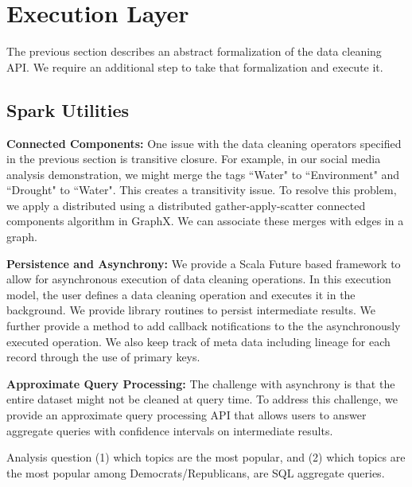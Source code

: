 \section{Execution Layer}
The previous section describes an abstract formalization of the data cleaning API.
We require an additional step to take that formalization and execute it.

\subsection{Spark Utilities}

\vspace{0.5em}

\noindent\textbf{Connected Components: } One issue with the data cleaning operators specified in the previous section is transitive closure. For example, in our social media analysis demonstration, we might merge the tags ``Water" to ``Environment" and ``Drought" to ``Water". This creates a transitivity issue. To resolve this problem, we apply a distributed using a distributed gather-apply-scatter connected components algorithm in GraphX. We can associate these merges with edges in a graph.

\noindent\textbf{Persistence and Asynchrony: } We provide a Scala \textsf{Future} based framework to allow for asynchronous execution of data cleaning operations.
In this execution model, the user defines a data cleaning operation and executes it in the background.
We provide library routines to persist intermediate results.
We further provide a method to add callback notifications to the the asynchronously executed operation.
We also keep track of meta data including lineage for each record through the use of primary keys.

\noindent\textbf{Approximate Query Processing: }
The challenge with asynchrony is that the entire dataset might not be cleaned at query time. To address this challenge, 
we provide an approximate query processing API that allows users to answer aggregate queries with confidence intervals 
on intermediate results.

\begin{example}
Analysis question (1) which topics are the most popular, and (2) which topics are the most popular among Democrats/Republicans,
are SQL aggregate queries.
\end{example}

